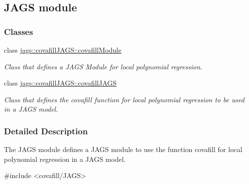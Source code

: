 \hypertarget{group__jags}{}\subsection{J\+A\+G\+S module}
\label{group__jags}
\subsubsection*{Classes}
\begin{DoxyCompactItemize}
\item 
class \hyperlink{classjags_1_1covafillJAGS_1_1covafillModule}{jags\+::covafill\+J\+A\+G\+S\+::covafill\+Module}
\begin{DoxyCompactList}\small\item\em Class that defines a J\+A\+G\+S Module for local polynomial regression. \end{DoxyCompactList}\item 
class \hyperlink{classjags_1_1covafillJAGS_1_1covafillJAGS}{jags\+::covafill\+J\+A\+G\+S\+::covafill\+J\+A\+G\+S}
\begin{DoxyCompactList}\small\item\em Class that defines the covafill function for local polynomial regression to be used in a J\+A\+G\+S model. \end{DoxyCompactList}\end{DoxyCompactItemize}


\subsubsection{Detailed Description}
The J\+A\+G\+S module defines a J\+A\+G\+S module to use the function covafill for local polynomial regression in a J\+A\+G\+S model. \begin{DoxyVerb}#include <covafill/JAGS>
\end{DoxyVerb}
 